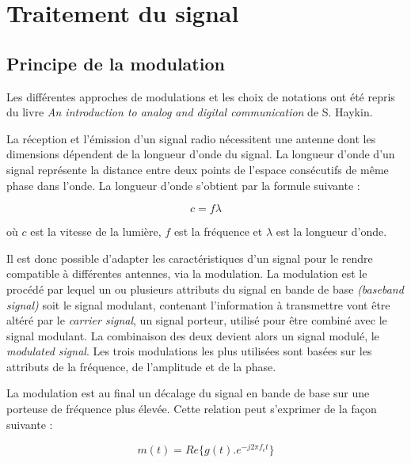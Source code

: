 \section{Traitement du signal}

\subsection{Principe de la modulation}\label{mod}

Les différentes approches de modulations et les choix de notations ont été repris du livre \textit{An introduction to analog and digital communication} de S. Haykin\cite{book1}.

\vspace{0.1cm}

La réception et l'émission d'un signal radio nécessitent une antenne dont les dimensions dépendent de la longueur d'onde du signal. La longueur d'onde d'un signal représente la distance entre deux points de l'espace consécutifs de même phase dans l'onde. La longueur d'onde s'obtient par la formule suivante :

\begin{equation}\label{eq1}
c = f \lambda
\end{equation}

où $c$ est la vitesse de la lumière, $f$ est la fréquence et $\lambda$ est la longueur d'onde.

\vspace{0.1cm}

Il est donc possible d'adapter les caractéristiques d'un signal pour le rendre compatible à différentes antennes, via la modulation. La modulation est le procédé par lequel un ou plusieurs attributs du signal en bande de base \textit{(baseband signal)} soit le signal modulant, contenant l'information à transmettre vont être altéré par le \textit{carrier signal}, un signal porteur, utilisé pour être combiné avec le signal modulant. La combinaison des deux devient alors un signal modulé, le \textit{modulated signal}. Les trois modulations les plus utilisées sont basées sur les attributs de la fréquence, de l'amplitude et de la phase.

\vspace{0.1cm}

La modulation est au final un décalage du signal en bande de base sur une porteuse de fréquence plus élevée. Cette relation peut s'exprimer de la façon suivante : 

\begin{equation}\label{eq110}
m(t) = Re\{ g(t).e^{-j2\pi f_c t}\}
\end{equation}

